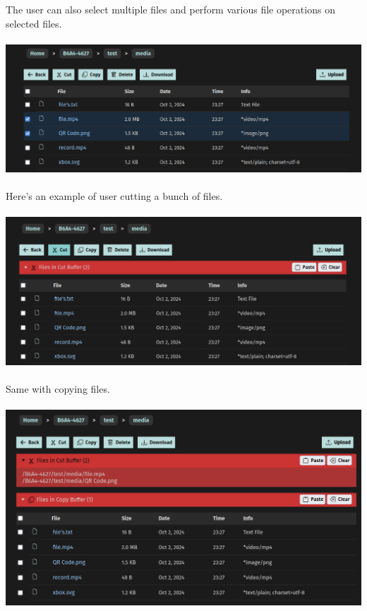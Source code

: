 \documentclass[12pt]{article}
\begin{document}
\clearpage
The user can also select multiple files and perform various file operations on selected files. \\ \\
\includegraphics[width=\linewidth]{ss/5.cm-select.png} \\ \\

Here's an example of user cutting a bunch of files. \\ \\
\includegraphics[width=\linewidth]{ss/6.cm-cut.png} \\ \\

\clearpage
Same with copying files. \\ \\
\includegraphics[width=\linewidth]{ss/7.cm-cut-copy.png} \\ \\
\end{document}
